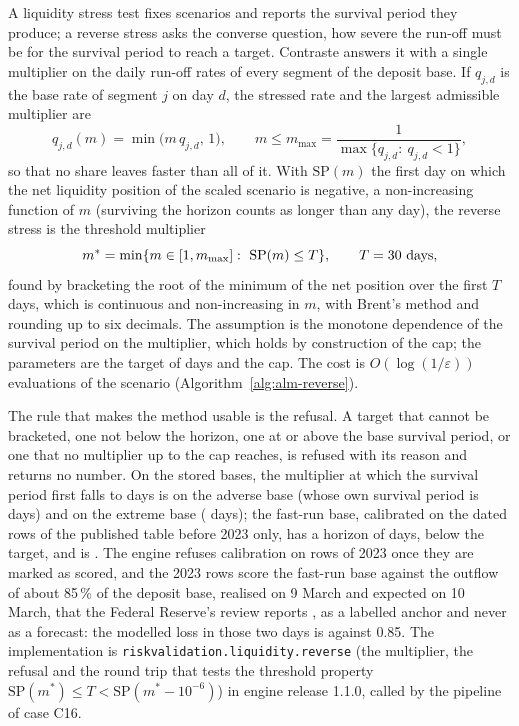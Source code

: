 A liquidity stress test fixes scenarios and reports the survival period they produce; a reverse stress asks the converse question, how severe the run-off must be for the survival period to reach a target. Contraste
answers it with a single multiplier on the daily run-off rates of every segment of the deposit base. If $q_{j,d}$ is the base rate of segment $j$ on day $d$, the stressed rate and the largest admissible multiplier are
\begin{equation}
q_{j,d}(m)=\min\big(m\,q_{j,d},\,1\big),\qquad m\le m_{\max}=\frac{1}{\max\{q_{j,d}:\ q_{j,d}<1\}},
\label{eq:bs11-rate}
\end{equation}
so that no share leaves faster than all of it. With $\mathrm{SP}(m)$ the first day on which the net liquidity position of the scaled scenario is negative, a non-increasing function of $m$ (surviving the horizon counts as longer than
any day), the reverse stress is the threshold multiplier
\begin{equation}
m^{*}=\min\{m\in[1,m_{\max}]:\ \mathrm{SP}(m)\le T\},\qquad T=30{}\ \text{days},
\label{eq:bs11-threshold}
\end{equation}
found by bracketing the root of the minimum of the net position over the first $T$ days, which is continuous and non-increasing in $m$, with Brent's method and rounding up to six decimals. The assumption is the monotone dependence
of the survival period on the multiplier, which holds by construction of the cap; the parameters are the target of \pxElevenTarget{} days and the cap. The cost is $O(\log(1/\varepsilon))$ evaluations of the scenario (Algorithm~\ref{alg:alm-reverse}).

The rule that makes the method usable is the refusal. A target that cannot be bracketed, one not below the horizon, one at or above the base survival period, or one that no multiplier up to the cap reaches, is refused with its
reason and returns no number. On the stored bases, the multiplier at which the survival period first falls to \pxElevenTarget{} days is \pxElevenAdverse{} on the adverse base (whose own survival period is
\pxElevenAdverseDay{} days) and \pxElevenExtreme{} on the extreme base (\pxElevenExtremeDay{} days); the fast-run base, calibrated on the dated rows of the published table before 2023 only, has a horizon of
\pxElevenFastDay{} days, below the target, and is \pxElevenFast{}. The engine refuses calibration on rows of 2023 once they are marked as scored, and the 2023 rows score the fast-run base against the outflow of about 85\,\% of the deposit base, realised on 9 March and expected on 10 March,
that the Federal Reserve's review reports \citep{alm:fed2023}, as a labelled anchor and never as a forecast: the modelled loss in those two days is \pxElevenSvb{} against 0.85. The implementation is \texttt{riskvalidation.liquidity.reverse} (the multiplier, the refusal and the round trip that tests
the threshold property $\mathrm{SP}(m^{*})\le T<\mathrm{SP}(m^{*}-10^{-6})$) in engine release 1.1.0, called by the pipeline of case C16.


